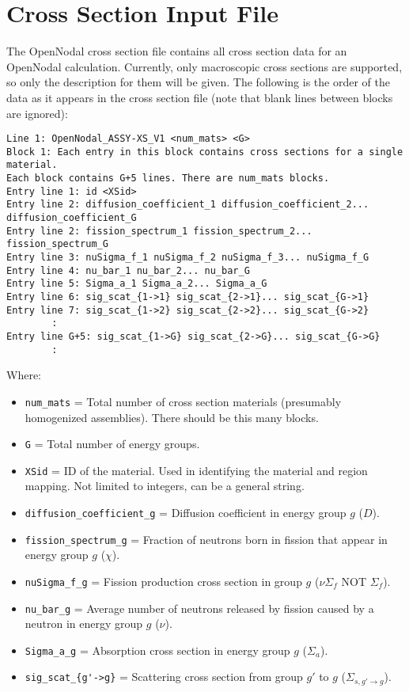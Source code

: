 \section{Cross Section Input File}

The OpenNodal cross section file contains all cross section data for an OpenNodal calculation.
Currently, only macroscopic cross sections are supported, so only the description for them will be given.
The following is the order of the data as it appears in the cross section file (note that blank lines between blocks are ignored):
\begin{verbatim}
Line 1: OpenNodal_ASSY-XS_V1 <num_mats> <G>
Block 1: Each entry in this block contains cross sections for a single material.
Each block contains G+5 lines. There are num_mats blocks.
Entry line 1: id <XSid>
Entry line 2: diffusion_coefficient_1 diffusion_coefficient_2... diffusion_coefficient_G
Entry line 2: fission_spectrum_1 fission_spectrum_2... fission_spectrum_G
Entry line 3: nuSigma_f_1 nuSigma_f_2 nuSigma_f_3... nuSigma_f_G
Entry line 4: nu_bar_1 nu_bar_2... nu_bar_G
Entry line 5: Sigma_a_1 Sigma_a_2... Sigma_a_G
Entry line 6: sig_scat_{1->1} sig_scat_{2->1}... sig_scat_{G->1}
Entry line 7: sig_scat_{1->2} sig_scat_{2->2}... sig_scat_{G->2}
        :
Entry line G+5: sig_scat_{1->G} sig_scat_{2->G}... sig_scat_{G->G}
        :
\end{verbatim}

Where:
\begin{itemize}
\item \verb"num_mats" = Total number of cross section materials (presumably homogenized assemblies). There should be this many blocks.
\item \verb"G" = Total number of energy groups.
\item \verb"XSid" = ID of the material. Used in identifying the material and region mapping. Not limited to integers, can be a general string.
\item \verb"diffusion_coefficient_g" = Diffusion coefficient in energy group $g$ ($D$).
\item \verb"fission_spectrum_g" = Fraction of neutrons born in fission that appear in energy group $g$ ($\chi$).
\item \verb"nuSigma_f_g" = Fission production cross section in group $g$ ($\nu\Sigma_f$ NOT $\Sigma_f$).
\item \verb"nu_bar_g" = Average number of neutrons released by fission caused by a neutron in energy group $g$ ($\nu$).
\item \verb"Sigma_a_g" = Absorption cross section in energy group $g$ ($\Sigma_a$).
\item \verb"sig_scat_{g'->g}" = Scattering cross section from group $g'$ to $g$ ($\Sigma_{s,g'\rightarrow g}$).
\end{itemize}